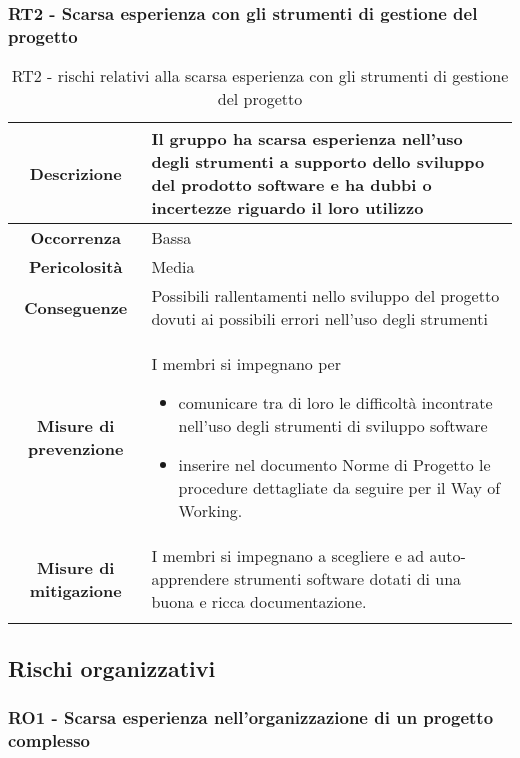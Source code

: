 \subsubsection[RT2]{RT2 - Scarsa esperienza con gli strumenti di gestione del progetto}\label{rt:2}
\begin{longtable}{|c|p{12cm}|}
\hline
\textbf{Descrizione} & Il gruppo ha scarsa esperienza nell'uso degli strumenti a supporto dello sviluppo del prodotto software e ha dubbi o incertezze riguardo il loro utilizzo \\
\hline
\textbf{Occorrenza} & Bassa \\
\hline
\textbf{Pericolosità} & Media \\
\hline
\textbf{Conseguenze} & Possibili rallentamenti nello sviluppo del progetto dovuti ai possibili errori nell'uso degli strumenti\\
\hline
\textbf{Misure di prevenzione} & 
I membri si impegnano per
\begin{itemize}
    \item comunicare tra di loro le difficoltà incontrate nell'uso degli strumenti di sviluppo software
    \item inserire nel documento Norme di Progetto le procedure dettagliate da seguire per il Way of Working.
\end{itemize} \\
\hline
\textbf{Misure di mitigazione} & I membri si impegnano a scegliere e ad auto-apprendere strumenti software dotati di una buona e ricca documentazione.\\
\hline
\caption{RT2 - rischi relativi alla scarsa esperienza con gli strumenti di gestione del progetto}
\end{longtable}

\subsection{Rischi organizzativi}
%
%
\subsubsection[RO1]{RO1 - Scarsa esperienza nell'organizzazione di un progetto complesso}  \label{ro:1} 
 
